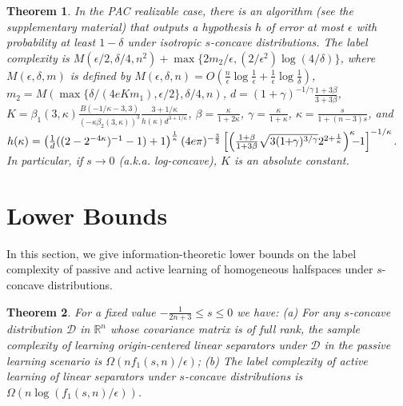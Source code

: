 \documentclass[11pt]{article}
\newcommand{\cD}{\mathcal{D}}
\newcommand{\R}{\mathbb{R}}
\newtheorem{theorem}{Theorem}
\begin{document}
\begin{theorem}
\label{theorem: Baum's algorithm}
In the PAC realizable case, there is an algorithm (see the supplementary material) that outputs a hypothesis $h$ of error at most $\epsilon$ with probability at least $1-\delta$ under isotropic $s$-concave distributions. The label complexity is $M(\epsilon/2,\delta/4,n^2)+\max\{2m_2/\epsilon,(2/\epsilon^2)\log(4/\delta)\}$, where $M(\epsilon,\delta,m)$ is defined by $M(\epsilon,\delta,n)=O\left(\frac{n}{\epsilon}\log \frac{1}{\epsilon}+\frac{1}{\epsilon}\log\frac{1}{\delta}\right)$, $m_2=M(\max\{\delta/(4eKm_1),\epsilon/2\},\delta/4,n)$, $d=(1+\gamma)^{-1/\gamma}\frac{1+3\beta}{3+3\beta}$, $K=\beta_1(3,\kappa)\frac{B(-1/\kappa-3,3)}{(-\kappa\beta_2(3,\kappa))^3}\frac{3+1/\kappa}{h(\kappa)d^{3+1/\kappa}}$, $\beta=\frac{\kappa}{1+2\kappa}$, $\gamma=\frac{\kappa}{1+\kappa}$, $\kappa=\frac{s}{1+(n-3)s}$, and $h(\kappa)=\left(\frac{1}{d}((2-2^{-4\kappa})^{-1}-1)+1\right)^{\frac{1}{\kappa}}(4e\pi)^{-\frac{3}{2}}\left[\left(\frac{1+\beta}{1+3\beta}\sqrt{3(1\hspace{-0.1cm}+\hspace{-0.1cm}\gamma)^{3/\gamma}}2^{2+\frac{1}{\kappa}}\right)^{\kappa}\hspace{-0.2cm}-\hspace{-0.1cm}1\right]^{-1/\kappa}$. In particular, if $s\rightarrow 0$ (a.k.a. log-concave), $K$ is an absolute constant.
\end{theorem}


\section{Lower Bounds}

In this section, we give information-theoretic lower bounds on the label complexity of passive and active learning of homogeneous halfspaces under $s$-concave distributions.
\begin{theorem}
\label{theorem: lower bounds of learning halfspace}
For a fixed value $-\frac{1}{2n+3}\le s\le 0$ we have: (a) For any $s$-concave distribution $\cD$ in $\R^n$ whose covariance matrix is of full rank, the sample complexity of learning origin-centered linear separators under $\cD$ in the passive learning scenario is $\Omega\left(nf_1(s,n)/\epsilon\right)$; (b) The label complexity of active learning of linear separators under $s$-concave distributions is $\Omega\left(n\log\left(f_1(s,n)/\epsilon\right)\right)$.
\end{theorem}
\end{document}
